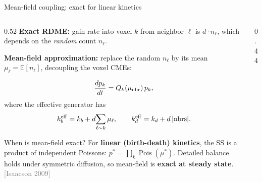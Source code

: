 \documentclass[10pt,aspectratio=169]{beamer}
\newcommand{\Pois}{\operatorname{Pois}}
\newcommand{\citeref}[1]{{\scriptsize\textcolor{gray}{[#1]}}}
\begin{document}
\begin{frame}{Mean-field coupling: exact for linear kinetics}

  \begin{columns}[T]
    \begin{column}{0.52\textwidth}
      \textbf{Exact RDME:} gain rate into voxel $k$ from neighbor $\ell$ is
      $d \cdot n_\ell$, which depends on the \emph{random} count $n_\ell$.

      \medskip
      \textbf{Mean-field approximation:} replace the random $n_\ell$ by its mean
      $\mu_\ell = \mathbb{E}[n_\ell]$, decoupling the voxel CMEs:

      \[
        \frac{d p_k}{dt} = Q_k(\mu_{\rm nbr})\,p_k,
      \]
      where the effective generator has
      \[
        k_b^{\rm eff} = k_b + d\!\sum_{\ell \sim k} \mu_\ell, \qquad
        k_d^{\rm eff} = k_d + d\,|\text{nbrs}|.
      \]

      \medskip
      \begin{block}{When is mean-field exact?}
        For \textbf{linear (birth-death) kinetics}, the SS is a product of
        independent Poissons: $p^* = \prod_k \Pois(\mu^*)$.
        Detailed balance holds under symmetric diffusion, so mean-field is
        \textbf{exact at steady state}.
        \citeref{Isaacson 2009}
      \end{block}
    \end{column}
    \begin{column}{0.44\textwidth}
      \begin{center}
\end{center}
\end{column}
\end{columns}
\end{frame}
\end{document}
